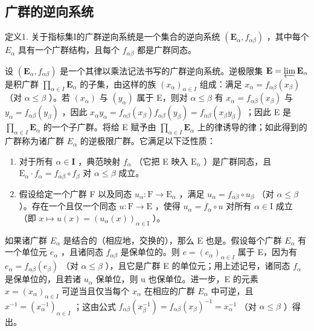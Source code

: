 \subsection{广群的逆向系统}

定义1. 关于指标集I的广群逆向系统是一个集合的逆向系统 \((\mathbf{E}_{\alpha}, f_{\alpha\beta})\) ，其中每个 \(E_{\alpha}\) 具有一个广群结构，且每个 \(f_{\alpha\beta}\) 都是广群同态。

设 \((\mathbf{E}_{\alpha}, f_{\alpha \beta})\) 是一个其律以乘法记法书写的广群逆向系统。逆极限集 \(\mathbf{E} = \varprojlim \mathbf{E}_{\alpha}\) 是积广群 \(\prod_{\alpha \in I} \mathbf{E}_{\alpha}\) 的子集，由这样的族 \((x_{\alpha})_{\alpha \in I}\) 组成：满足 \(x_{\alpha} = f_{\alpha \beta}(x_{\beta})\) （对 \(\alpha \leqslant \beta\) ）。若 \((x_{\alpha})\) 与 \((y_{\alpha})\) 属于 E，则对 \(\alpha \leqslant \beta\) 有 \(x_{\alpha} = f_{\alpha \beta}(x_{\beta})\) 与 \(y_{\alpha} = f_{\alpha \beta}(y_{\beta})\) ，因此 \(x_{\alpha}y_{\alpha} = f_{\alpha \beta}(x_{\beta})f_{\alpha \beta}(y_{\beta}) = f_{\alpha \beta}(x_{\beta}y_{\beta})\) ；因此 E 是 \(\prod_{\alpha \in I} \mathbf{E}_{\alpha}\) 的一个子广群。将给 E 赋予由 \(\prod_{\alpha \in I} \mathbf{E}_{\alpha}\) 上的律诱导的律；如此得到的广群称为诸广群 \(E_{\alpha}\) 的逆极限广群。它满足以下泛性质：

\begin{enumerate}
\def\labelenumi{(\alph{enumi})}
\item
  对于所有 \(\alpha \in \mathbf{I}\) ，典范映射 \(f_{\alpha}\) （它把 E 映入 \(\mathrm{E}_{\alpha}\) ）是广群同态，且 \(\mathrm{E}_{\alpha} \cdot f_{\alpha} = f_{\alpha \beta} \circ f_{\beta}\) 对 \(\alpha \leqslant \beta\) 成立。
\item
  假设给定一个广群 F 以及同态 \(u_{\alpha} \colon \mathrm{F} \to \mathrm{E}_{\alpha}\) ，满足 \(u_{\alpha} = f_{\alpha \beta} \circ u_{\beta}\) （对 \(\alpha \leqslant \beta\) ）。存在一个且仅一个同态 \(u \colon \mathrm{F} \to \mathrm{E}\) ，使得 \(u_{\alpha} = f_{\alpha} \circ u\) 对所有 \(\alpha \in \mathrm{I}\) 成立（即 \(x \mapsto u(x) = (u_{\alpha}(x))_{\alpha \in \mathrm{I}}\) ）。
\end{enumerate}

如果诸广群 \(E_{\alpha}\) 是结合的（相应地，交换的），那么 E 也是。假设每个广群 \(E_{\alpha}\) 有一个单位元 \(e_{\alpha}\) ，且诸同态 \(f_{\alpha\beta}\) 是保单位的。则 \(e = (e_{\alpha})_{\alpha \in I}\) 属于 E，因为有 \(e_{\alpha} = f_{\alpha\beta}(e_{\beta})\) （对 \(\alpha \leqslant \beta\) ），且它是广群 E 的单位元；用上述记号，诸同态 \(f_{\alpha}\) 是保单位的，且若诸 \(u_{\alpha}\) 保单位，则 u 也保单位。进一步，E 的元素 \(x = (x_{\alpha})_{\alpha \in I}\) 可逆当且仅当每个 \(x_{\alpha}\) 在相应的广群 \(E_{\alpha}\) 中可逆，且 \(x^{-1} = (x_{\alpha}^{-1})_{\alpha \in I}\) ；这由公式 \(f_{\alpha\beta}(x_{\beta}^{-1}) = f_{\alpha\beta}(x_{\beta})^{-1} = x_{\alpha}^{-1}\) （对 \(\alpha \leqslant \beta\) ）得出。

